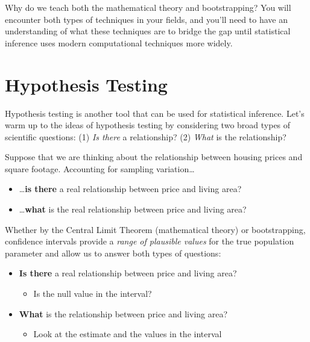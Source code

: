 \documentclass[
]{book}
\providecommand{\tightlist}{%
  \setlength{\itemsep}{0pt}\setlength{\parskip}{0pt}}
\begin{document}
Why do we teach both the mathematical theory and bootstrapping? You will encounter both types of techniques in your fields, and you'll need to have an understanding of what these techniques are to bridge the gap until statistical inference uses modern computational techniques more widely.

\hypertarget{hypothesis-testing}{%
\section{Hypothesis Testing}\label{hypothesis-testing}}

Hypothesis testing is another tool that can be used for statistical inference. Let's warm up to the ideas of hypothesis testing by considering two broad types of scientific questions: (1) \emph{Is there} a relationship? (2) \emph{What} is the relationship?

Suppose that we are thinking about the relationship between housing prices and square footage. Accounting for sampling variation\ldots{}

\begin{itemize}
\tightlist
\item
  \ldots{}\textbf{is there} a real relationship between price and living area?
\item
  \ldots{}\textbf{what} is the real relationship between price and living area?
\end{itemize}

Whether by the Central Limit Theorem (mathematical theory) or bootstrapping, confidence intervals provide a \emph{range of plausible values} for the true population parameter and allow us to answer both types of questions:

\begin{itemize}
\tightlist
\item
  \textbf{Is there} a real relationship between price and living area?

  \begin{itemize}
  \tightlist
  \item
    Is the null value in the interval?
  \end{itemize}
\item
  \textbf{What} is the relationship between price and living area?

  \begin{itemize}
  \tightlist
  \item
    Look at the estimate and the values in the interval
  \end{itemize}
\end{itemize}
\end{document}
